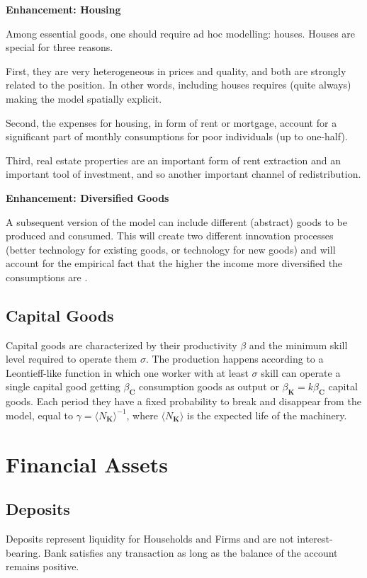 \documentclass[a4paper, headings=standardclasses]{scrartcl}
\newenvironment{enh}[1][]{\begin{framed}\noindent\textbf{Enhancement: #1}\par}{\end{framed}}
\begin{document}
\begin{enh}[Housing]
	Among essential goods, one should require ad hoc modelling: houses. Houses are special for three reasons.

	First, they are very heterogeneous in prices and quality, and both are strongly related to the position. In other words, including houses requires (quite always) making the model spatially explicit.

	Second, the expenses for housing, in form of rent or mortgage, account for a significant part of monthly consumptions for poor individuals (up to one-half).

	Third, real estate properties are an important form of rent extraction and an important tool of investment, and so another important channel of redistribution.
\end{enh}

\begin{enh}[Diversified Goods]
	A subsequent version of the model can include different (abstract) goods to be produced and consumed. This will create two different innovation processes (better technology for existing goods, or technology for new goods) and will account for the empirical fact that the higher the income more diversified the consumptions are \parencite[cfr.][§2]{didomenico2022}.
\end{enh}

\subsection{Capital Goods}
Capital goods are characterized by their productivity $\beta$ and the minimum skill level required to operate them $\sigma$. The production happens according to a Leontieff-like function in which one worker with at least $\sigma$ skill can operate a single capital good getting $\beta_\mathbf{C}$ consumption goods as output or $\beta_\mathbf{K} = k \beta_\mathbf{C}$ capital goods. Each period they have a fixed probability to break and disappear from the model, equal to $\gamma = \langle N_\mathbf{K} \rangle^{-1}$, where $\langle N_\mathbf{K} \rangle$ is the expected life of the machinery.

\section{Financial Assets}

\subsection{Deposits}
Deposits represent liquidity for Households and Firms and are not interest-bearing. Bank satisfies any transaction as long as the balance of the account remains positive.
\end{document}
